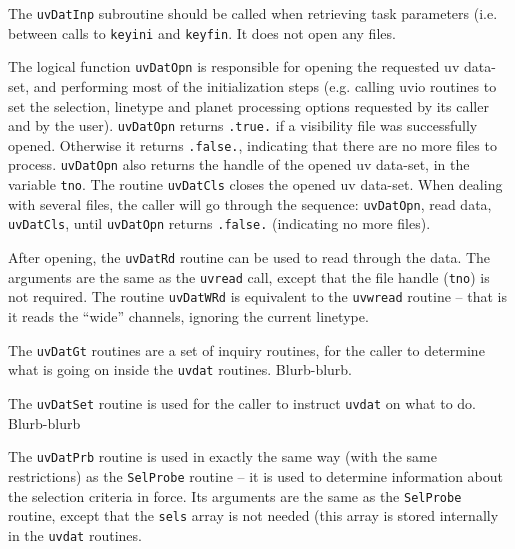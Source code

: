 \documentclass{report}
\begin{document}
The {\tt uvDatInp} subroutine should be called when retrieving task parameters
(i.e. between calls to {\tt keyini} and {\tt keyfin}. It does not open any files.

The logical function {\tt uvDatOpn} is responsible for opening the requested
uv data-set, and performing most of the initialization steps (e.g. calling
uvio routines to set the selection, linetype and planet processing options
requested by its caller and by the user). {\tt uvDatOpn} returns {\tt .true.}
if a visibility file was successfully opened. Otherwise it returns {\tt .false.},
indicating that there are no more files to process. {\tt uvDatOpn} also returns
the handle of the opened uv data-set, in the variable {\tt tno}. The routine
{\tt uvDatCls} closes the opened uv data-set. When dealing with several files,
the caller will go through the sequence: {\tt uvDatOpn}, read data, {\tt uvDatCls},
until {\tt uvDatOpn} returns {\tt .false.} (indicating no more files).

After opening, the {\tt uvDatRd} routine can be used to read through the data.
The arguments are the same as the {\tt uvread} call, except that the file handle
({\tt tno}) is not required. The routine {\tt uvDatWRd} is equivalent to the
{\tt uvwread} routine -- that is it reads the ``wide'' channels, ignoring the
current linetype.

The {\tt uvDatGt} routines are a set of inquiry routines, for the caller to
determine what is going on inside the {\tt uvdat} routines. Blurb-blurb.

The {\tt uvDatSet} routine is used for the caller to instruct {\tt uvdat} on what to
do. Blurb-blurb

The {\tt uvDatPrb} routine is used in exactly the same way (with the same
restrictions) as the {\tt SelProbe} routine -- it is used to
determine information about the selection criteria in force. Its arguments are the
same as the {\tt SelProbe} routine, except that the {\tt sels} array is not needed
(this array is stored internally in the {\tt uvdat} routines.
\end{document}
